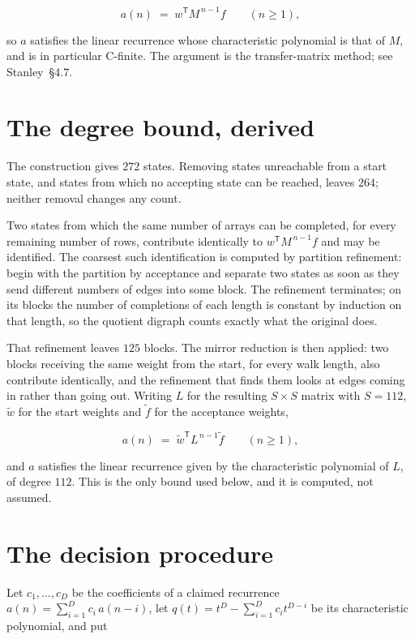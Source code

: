 \documentclass[11pt]{article}
\theoremstyle{definition}
\begin{document}
\[a(n) \;=\; w^{\mathsf T} M^{\,n-1} f \qquad (n \ge 1),\]

so $a$ satisfies the linear recurrence whose characteristic polynomial is that of $M$, and is in particular C-finite. The argument is the transfer-matrix method; see Stanley~\S4.7.

\section{The degree bound, derived}

The construction gives $272$ states. Removing states unreachable from a start state, and states from which no accepting state can be reached, leaves $264$; neither removal changes any count.

Two states from which the same number of arrays can be completed, for every remaining number of rows, contribute identically to $w^{\mathsf T}M^{\,n-1}f$ and may be identified. The coarsest such identification is computed by partition refinement: begin with the partition by acceptance and separate two states as soon as they send different numbers of edges into some block. The refinement terminates; on its blocks the number of completions of each length is constant by induction on that length, so the quotient digraph counts exactly what the original does.

That refinement leaves $125$ blocks. The mirror reduction is then applied: two blocks receiving the same weight from the start, for every walk length, also contribute identically, and the refinement that finds them looks at edges coming in rather than going out. Writing $L$ for the resulting $S \times S$ matrix with $S = 112$, $\tilde w$ for the start weights and $\tilde f$ for the acceptance weights,

\[a(n) \;=\; \tilde w^{\mathsf T} L^{\,n-1} \tilde f \qquad (n \ge 1),\]

and $a$ satisfies the linear recurrence given by the characteristic polynomial of $L$, of degree $112$. This is the only bound used below, and it is computed, not assumed.

\section{The decision procedure}

Let $c_1,\dots,c_D$ be the coefficients of a claimed recurrence $a(n) = \sum_{i=1}^{D} c_i\,a(n-i)$, let $q(t) = t^{D} - \sum_{i=1}^{D} c_i t^{D-i}$ be its characteristic polynomial, and put
\end{document}

